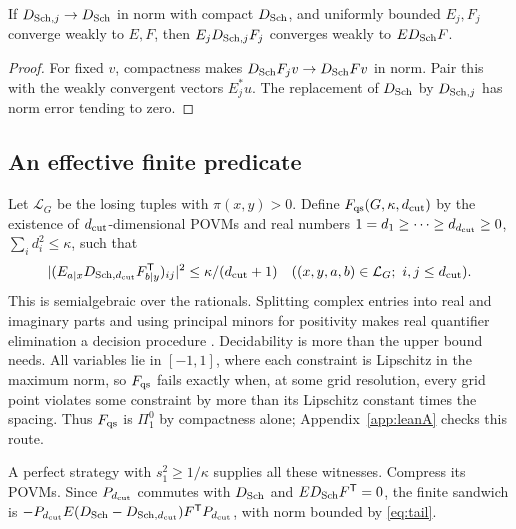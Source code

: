 \begin{lemma}\label{lem:sandwich}
If $D_{{\rm Sch},j}\to D_{\rm Sch}$ in norm with compact $D_{\rm Sch}$, and uniformly bounded $E_j,F_j$ converge weakly to $E,F$, then $E_jD_{{\rm Sch},j}F_j$ converges weakly to $ED_{\rm Sch}F$.
\end{lemma}
\begin{proof}
For fixed $v$, compactness makes $D_{\rm Sch}F_jv\to D_{\rm Sch}Fv$ in norm. Pair this with the weakly convergent vectors $E_j^*u$. The replacement of $D_{\rm Sch}$ by $D_{{\rm Sch},j}$ has norm error tending to zero.
\end{proof}

\subsection{An effective finite predicate}
Let $\mathcal L_G$ be the losing tuples with $\pi(x,y)>0$. Define $F_{\mathrm{qs}}(G,\kappa,{d_{\rm cut}})$ by the existence of ${d_{\rm cut}}$-dimensional POVMs and real numbers $1=d_1\geq\cdots\geq d_{d_{\rm cut}}\geq0$, $\sum_i d_i^2\leq \kappa$, such that
\begin{equation}\label{eq:stage}
 |(E_{a|x}D_{{\rm Sch},{d_{\rm cut}}}F_{b|y}^{\mathsf T})_{ij}|^2\leq \kappa/({d_{\rm cut}}+1)
 \quad((x,y,a,b)\in\mathcal L_G;\ i,j\leq {d_{\rm cut}}).
\end{equation}
This is semialgebraic over the rationals. Splitting complex entries into real and imaginary parts and using principal minors for positivity makes real quantifier elimination a decision procedure \cite{BPR}. Decidability is more than the upper bound needs. All variables lie in $[-1,1]$, where each constraint is Lipschitz in the maximum norm, so $F_{\mathrm{qs}}$ fails exactly when, at some grid resolution, every grid point violates some constraint by more than its Lipschitz constant times the spacing. Thus $F_{\mathrm{qs}}$ is $\Pi^0_1$ by compactness alone; Appendix~\ref{app:leanA} checks this route.

A perfect strategy with $s_1^2\geq1/\kappa$ supplies all these witnesses. Compress its POVMs. Since $P_{d_{\rm cut}}$ commutes with $D_{\rm Sch}$ and $ED_{\rm Sch}F^{\mathsf T}=0$, the finite sandwich is $-P_{d_{\rm cut}}E(D_{\rm Sch}-D_{{\rm Sch},{d_{\rm cut}}})F^{\mathsf T}P_{d_{\rm cut}}$, with norm bounded by \eqref{eq:tail}.

